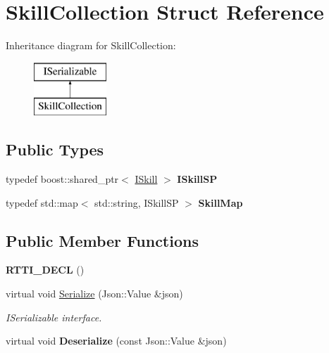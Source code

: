\hypertarget{struct_skill_collection}{}\section{Skill\+Collection Struct Reference}
\label{struct_skill_collection}
Inheritance diagram for Skill\+Collection\+:\begin{figure}[H]
\begin{center}
\leavevmode
\includegraphics[height=2.000000cm]{struct_skill_collection}
\end{center}
\end{figure}
\subsection*{Public Types}
\begin{DoxyCompactItemize}
\item 
\mbox{\label{struct_skill_collection_aca267e890008e7f71ab14e97a05dff8a}} 
typedef boost\+::shared\+\_\+ptr$<$ \hyperlink{class_i_skill}{I\+Skill} $>$ {\bfseries I\+Skill\+SP}
\item 
\mbox{\label{struct_skill_collection_afc4b2159eeaaa114856db2797250f622}} 
typedef std\+::map$<$ std\+::string, I\+Skill\+SP $>$ {\bfseries Skill\+Map}
\end{DoxyCompactItemize}
\subsection*{Public Member Functions}
\begin{DoxyCompactItemize}
\item 
\mbox{\label{struct_skill_collection_af614f1cdf9c326185b1af96ef08efd08}} 
{\bfseries R\+T\+T\+I\+\_\+\+D\+E\+CL} ()
\item 
\mbox{\label{struct_skill_collection_a50aafa284b5c79743f640e6a1b39522b}} 
virtual void \hyperlink{struct_skill_collection_a50aafa284b5c79743f640e6a1b39522b}{Serialize} (Json\+::\+Value \&json)
\begin{DoxyCompactList}\small\item\em I\+Serializable interface. \end{DoxyCompactList}\item 
\mbox{\label{struct_skill_collection_a5614a31f13481a581aa1e8e18b62990f}} 
virtual void {\bfseries Deserialize} (const Json\+::\+Value \&json)
\end{DoxyCompactItemize}
